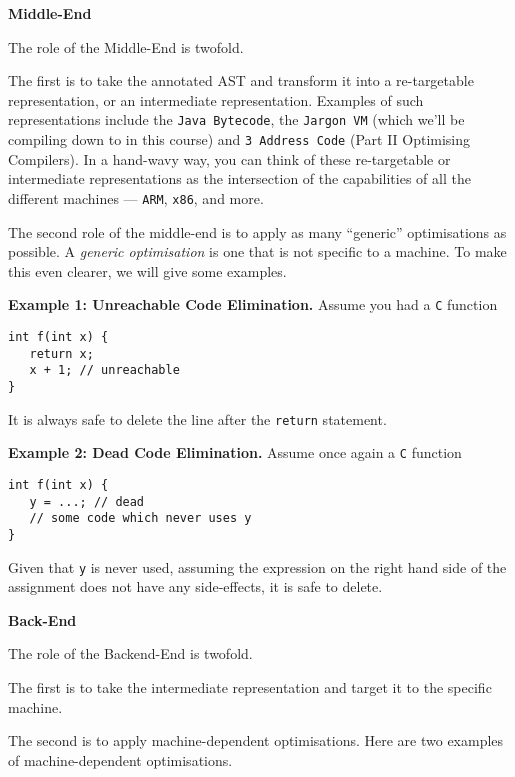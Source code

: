 \begin{minipage}[t]{0.15\textwidth}
\textbf{\sffamily Middle-End}    
\end{minipage}%
\begin{minipage}[t]{0.85\textwidth}
    \setlength{\parskip}{.5\baselineskip}
    
    The role of the Middle-End is twofold.

    The first is to take the annotated AST and transform it into a re-targetable representation, or an intermediate representation. Examples of such representations include the \texttt{Java Bytecode}, the \texttt{Jargon VM} (which we'll be compiling down to in this course) and \texttt{3 Address Code} ({\sffamily Part II Optimising Compilers}). In a hand-wavy way, you can think of these re-targetable or intermediate representations as the intersection of the capabilities of all the different machines --- \texttt{ARM}, \texttt{x86}, and more.

    The second role of the middle-end is to apply as many ``generic'' optimisations as possible. A \emph{generic optimisation} is one that is not specific to a machine. To make this even clearer, we will give some examples. 

    \textbf{Example 1: Unreachable Code Elimination.} Assume you had a \texttt{C} function

    \begin{verbatim}
int f(int x) {
   return x;
   x + 1; // unreachable
}
    \end{verbatim}
    It is always safe to delete the line after the \texttt{return} statement. 

    \textbf{Example 2: Dead Code Elimination.} Assume once again a \texttt{C} function

    \begin{verbatim}
int f(int x) {
   y = ...; // dead
   // some code which never uses y
}
    \end{verbatim}
    Given that \texttt{y} is never used, assuming the expression on the right hand side of the assignment does not have any side-effects, it is safe to delete.

\end{minipage}

\begin{minipage}[t]{0.15\textwidth}
\textbf{\sffamily Back-End}    
\end{minipage}%
\begin{minipage}[t]{0.85\textwidth}
    \setlength{\parskip}{.5\baselineskip}
    The role of the Backend-End is twofold. 

    The first is to take the intermediate representation and target it to the specific machine. 

    The second is to apply machine-dependent optimisations. Here are two examples of machine-dependent optimisations.
        
\end{minipage}


